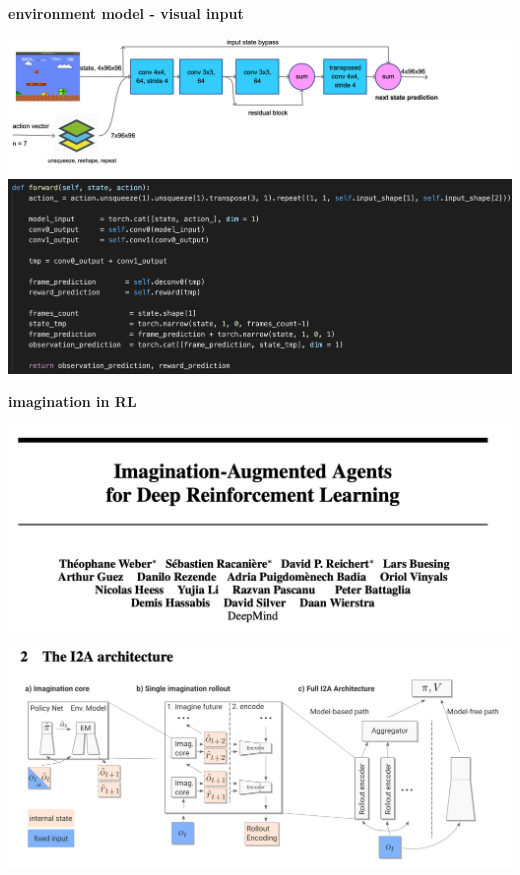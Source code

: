 \documentclass[xcolor=dvipsnames]{beamer}
\begin{document}
\begin{frame}{\bf environment model - visual input}

  {\centering \includegraphics[scale=0.12]{../diagrams/convcuriositydetail.png}}
  {\centering \includegraphics[scale=0.3]{../images/curiosity_conv.png}}

\end{frame}

\begin{frame}{\bf imagination in RL}

  {\centering \includegraphics[scale=0.2]{../images/paper_imagination_0.png}}

  {\centering \includegraphics[scale=0.3]{../images/paper_imagination_1.png}}

\end{frame}
\end{document}
